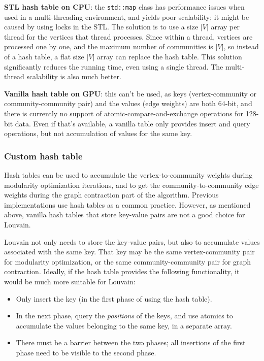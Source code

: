 \documentclass[10pt,oneside]{memoir}
\providecommand{\tightlist}{%
  \setlength{\itemsep}{0pt}\setlength{\parskip}{0pt}}
\begin{document}
\textbf{STL hash table on CPU}: the \texttt{std::map} class has
performance issues when used in a multi-threading environment, and
yields poor scalability; it might be caused by using locks in the STL.
The solution is to use a size \(|V|\) array per thread for the vertices
that thread processes. Since within a thread, vertices are processed one
by one, and the maximum number of communities is \(|V|\), so instead of
a hash table, a flat size \(|V|\) array can replace the hash table. This
solution significantly reduces the running time, even using a single
thread. The multi-thread scalability is also much better.

\textbf{Vanilla hash table on GPU}: this can't be used, as keys
(vertex-community or community-community pair) and the values (edge
weights) are both 64-bit, and there is currently no support of
atomic-compare-and-exchange operations for 128-bit data. Even if that's
available, a vanilla table only provides insert and query operations,
but not accumulation of values for the same key.

\hypertarget{custom-hash-table}{%
\subsubsection{Custom hash table}\label{custom-hash-table}}

Hash tables can be used to accumulate the vertex-to-community weights
during modularity optimization iterations, and to get the
community-to-community edge weights during the graph contraction part of
the algorithm. Previous implementations use hash tables as a common
practice. However, as mentioned above, vanilla hash tables that store
key-value pairs are not a good choice for Louvain.

Louvain not only needs to store the key-value pairs, but also to
accumulate values associated with the same key. That key may be the same
vertex-community pair for modularity optimization, or the same
community-community pair for graph contraction. Ideally, if the hash
table provides the following functionality, it would be much more
suitable for Louvain:

\begin{itemize}
\tightlist
\item
  Only insert the key (in the first phase of using the hash table).
\item
  In the next phase, query the \emph{positions} of the keys, and use
  atomics to accumulate the values belonging to the same key, in a
  separate array.
\item
  There must be a barrier between the two phases; all insertions of the
  first phase need to be visible to the second phase.
\end{itemize}
\end{document}
